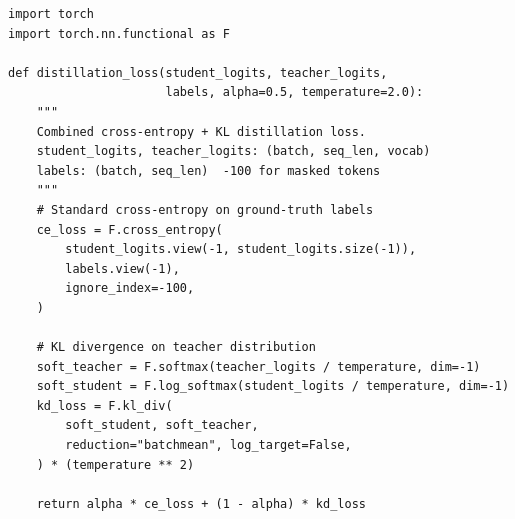 \begin{lstlisting}[style=pythonstyle, caption={Logit-level knowledge distillation training step}]
import torch
import torch.nn.functional as F

def distillation_loss(student_logits, teacher_logits,
                      labels, alpha=0.5, temperature=2.0):
    """
    Combined cross-entropy + KL distillation loss.
    student_logits, teacher_logits: (batch, seq_len, vocab)
    labels: (batch, seq_len)  -100 for masked tokens
    """
    # Standard cross-entropy on ground-truth labels
    ce_loss = F.cross_entropy(
        student_logits.view(-1, student_logits.size(-1)),
        labels.view(-1),
        ignore_index=-100,
    )

    # KL divergence on teacher distribution
    soft_teacher = F.softmax(teacher_logits / temperature, dim=-1)
    soft_student = F.log_softmax(student_logits / temperature, dim=-1)
    kd_loss = F.kl_div(
        soft_student, soft_teacher,
        reduction="batchmean", log_target=False,
    ) * (temperature ** 2)

    return alpha * ce_loss + (1 - alpha) * kd_loss
\end{lstlisting}


